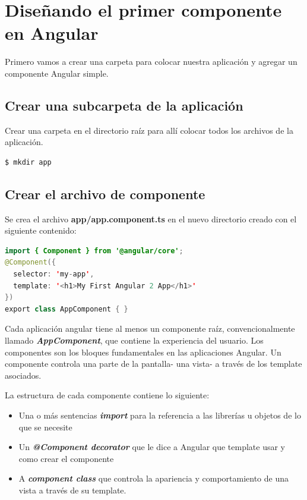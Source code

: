 \documentclass[12pt,twoside]{book}
\begin{document}
\section{Diseñando el primer componente en Angular}

Primero vamos a crear una carpeta para colocar nuestra aplicación y agregar un componente Angular simple.

\subsection{Crear una subcarpeta de la aplicación}
 Crear una carpeta en el directorio raíz para allí colocar todos los archivos de la aplicación.
 \begin{lstlisting}[language=bash]
 $ mkdir app
 \end{lstlisting}

\subsection{Crear el archivo de componente}

Se crea el archivo \textbf{app/app.component.ts} en el nuevo directorio creado con el siguiente contenido:
\begin{lstlisting}[language=java]
import { Component } from '@angular/core';
@Component({
  selector: 'my-app',
  template: '<h1>My First Angular 2 App</h1>'
})
export class AppComponent { }
\end{lstlisting}

Cada aplicación angular tiene al menos un componente raíz, convencionalmente llamado \textbf{\textit{AppComponent}}, que contiene la experiencia del usuario. Los componentes son los bloques fundamentales en las aplicaciones Angular. Un componente controla una parte de la pantalla- una vista- a través de los template asociados.

La estructura de cada componente contiene lo siguiente:

\begin{itemize}
\item Una o más sentencias \textit{\textbf{import}} para la referencia a las librerías u objetos de lo que se necesite
\item Un \textit{\textbf{@Component decorator}} que le dice a Angular que template usar y como crear el componente
\item A \textit{\textbf{component class}} que controla la apariencia y comportamiento de una vista a través de su template.
\end{itemize}
\end{document}
